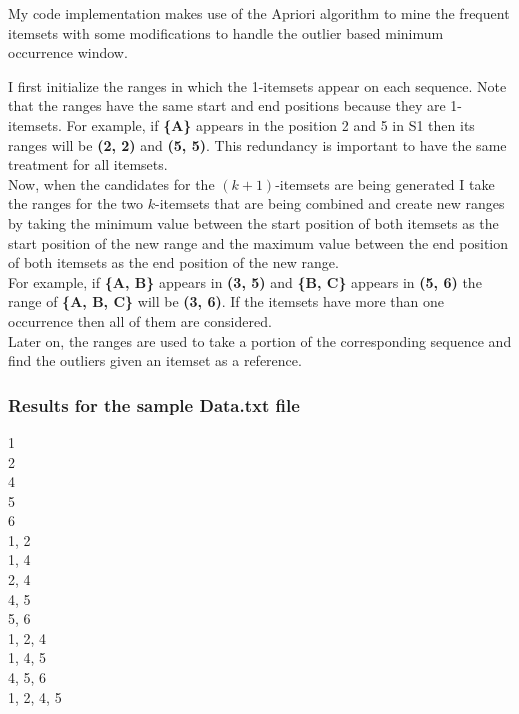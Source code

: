 \documentclass[11pt]{article}
\begin{document}
My code implementation makes use of the Apriori algorithm to mine the frequent itemsets with some modifications to handle the outlier based minimum occurrence window.

I first initialize the ranges in which the 1-itemsets appear on each sequence. Note that the ranges have the same start and end positions because they are 1-itemsets. For example, if \textbf{\{A\}} appears in the position 2 and 5 in S1 then its ranges will be \textbf{(2, 2)} and \textbf{(5, 5)}. This redundancy is important to have the same treatment for all itemsets.\\

Now, when the candidates for the $(k+1)$-itemsets are being generated I take the ranges for the two $k$-itemsets that are being combined and create new ranges by taking the minimum value between the start position of both itemsets as the start position of the new range and the maximum value between the end position of both itemsets as the end position of the new range.\\
For example, if \textbf{\{A, B\}} appears in \textbf{(3, 5)} and \textbf{\{B, C\}} appears in \textbf{(5, 6)} the range of \textbf{\{A, B, C\}} will be \textbf{(3, 6)}. If the itemsets have more than one occurrence then all of them are considered.\\

Later on, the ranges are used to take a portion of the corresponding sequence and find the outliers given an itemset as a reference.\\

\subsubsection*{Results for the sample Data.txt file}
1\\
2\\
4\\
5\\
6\\
1, 2\\
1, 4\\
2, 4\\
4, 5\\
5, 6\\
1, 2, 4\\
1, 4, 5\\
4, 5, 6\\
1, 2, 4, 5\\
\end{document}
